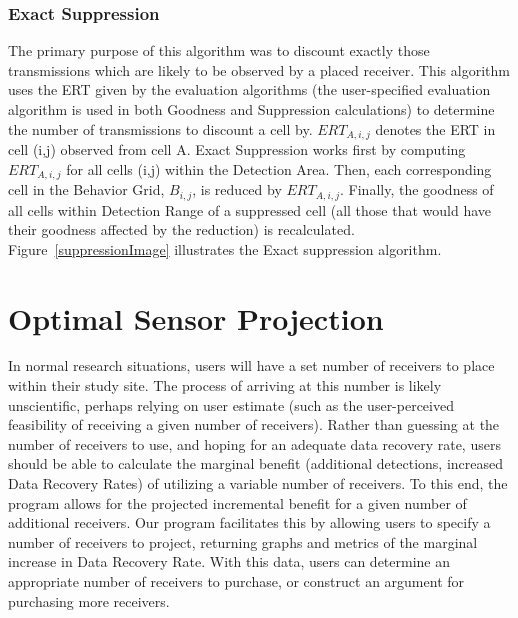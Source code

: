 \subsubsection{Exact Suppression}
\label{exactSuppression}
The primary purpose of this algorithm was to discount exactly those transmissions which are likely to be observed by a placed receiver.  This algorithm uses the ERT given by the evaluation algorithms (the user-specified evaluation algorithm is used in both Goodness and Suppression calculations) to determine the number of transmissions to discount a cell by.  $ERT_{A,i,j}$ denotes the ERT in cell (i,j) observed from cell A.  Exact Suppression works first by computing $ERT_{A,i,j}$ for all cells (i,j)  within the Detection Area.  Then, each corresponding cell in the Behavior Grid, $B_{i,j}$, is reduced by $ERT_{A,i,j}$.  Finally, the goodness of all cells within Detection Range of a suppressed cell (all those that would have their goodness affected by the reduction) is recalculated.  Figure~\ref{suppressionImage} illustrates the Exact suppression algorithm.  

\section{Optimal Sensor Projection}
In normal research situations, users will have a set number of receivers to place within their study site.  The process of arriving at this number is likely unscientific, perhaps relying on user estimate (such as the user-perceived feasibility of receiving a given number of receivers).  Rather than guessing at the number of receivers to use, and hoping for an adequate data recovery rate, users should be able to calculate the marginal benefit (additional detections, increased Data Recovery Rates) of utilizing a variable number of receivers.   To this end, the program allows for the projected incremental benefit for a given number of additional receivers.  Our program facilitates this by allowing users to specify a number of receivers to project, returning graphs and metrics of the marginal increase in Data Recovery Rate.  With this data, users can determine an appropriate number of receivers to purchase, or construct an argument for purchasing more receivers.



